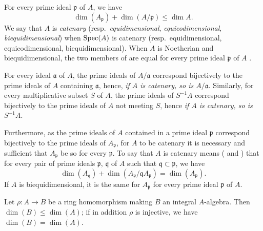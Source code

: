 \begin{env}[16.1.4]
\label{0.16.1.4}
For every prime ideal $\mathfrak{p}$ of $A$, we have 
\begin{equation}
\label{0.16.1.4.1}
\tag{16.1.4.1}
  \dim(A_\mathfrak{p})+\dim(A/\mathfrak{p})\leq\dim A.
\end{equation}
We say that $A$ is \emph{catenary} (resp.~\emph{equidimensional}, \emph{equicodimensional}, \emph{biequidimensional}) when $\operatorname{Spec}(A)$ is catenary (resp.~equidimensional, equicodimensional, biequidimensional).
When $A$ is Noetherian and biequidimensional, the two members of  are equal for every prime ideal $\mathfrak{p}$ of $A$ .

For every ideal $\mathfrak{a}$ of $A$, the prime ideals of $A/\mathfrak{a}$ correspond bijectively to the prime ideals of $A$ containing $\mathfrak{a}$, hence, \emph{if $A$ is catenary, so is $A/\mathfrak{a}$}.
Similarly, for every multiplicative subset $S$ of $A$, the prime ideals of $S^{-1}A$ correspond bijectively to the prime ideals of $A$ not meeting $S$, hence \emph{if $A$ is catenary, so is $S^{-1}A$}.

Furthermore, as the prime ideals of $A$ contained in a prime ideal $\mathfrak{p}$ correspond bijectively to the prime ideals of $A_\mathfrak{p}$, for $A$ to be catenary it is necessary and sufficient that $A_\mathfrak{p}$ be so for every $\mathfrak{p}$.
To say that $A$ is catenary means ( and ) that for every pair of prime ideals $\mathfrak{p}$, $\mathfrak{q}$ of $A$ such that $\mathfrak{q}\subset\mathfrak{p}$, we have
\begin{equation}
\label{0.16.1.4.2}
\tag{16.1.4.2}
  \dim(A_\mathfrak{q})+\dim(A_\mathfrak{p}/\mathfrak{q}A_\mathfrak{p})=\dim(A_\mathfrak{p}).
\end{equation}
If $A$ is biequidimensional, it is the same for $A_\mathfrak{p}$ for every prime ideal $\mathfrak{p}$ of $A$.
\end{env}

\begin{proposition}[16.1.5]
\label{0.16.1.5}
Let $\rho:A\to B$ be a ring homomorphism making $B$ an integral $A$-algebra.
Then $\dim(B)\leq\dim(A)$; if in addition $\rho$ is injective, we have $\dim(B)=\dim(A)$.
\end{proposition}

